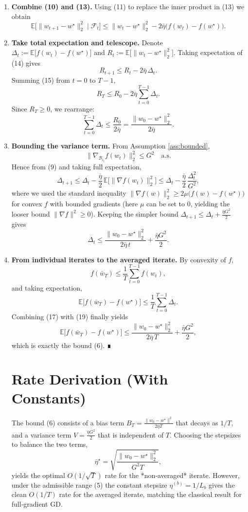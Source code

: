 \documentclass{article}
\newcommand{\E}{\mathbb{E}}
\begin{document}
\begin{enumerate}
\item[Step 4.] \textbf{Combine (10) and (13).}  
Using (11) to replace the inner product in (13) we obtain
\[
\E\!\bigl[\|w_{t+1}-w^{\star}\|_{2}^{2}\mid\mathcal{F}_{t}\bigr]
\le \|w_{t}-w^{\star}\|_{2}^{2}
-2\bar\eta\bigl(f(w_{t})-f(w^{\star})\bigr).
\tag{14}
\]

\item[Step 5.] \textbf{Take total expectation and telescope.}  
Denote $\Delta_{t}:=\E\bigl[f(w_{t})-f(w^{\star})\bigr]$ and $R_{t}:=\E\bigl[\|w_{t}-w^{\star}\|_{2}^{2}\bigr]$.  
Taking expectation of (14) gives
\[
R_{t+1}\le R_{t}-2\bar\eta\,\Delta_{t}.
\tag{15}
\]
Summing (15) from $t=0$ to $T-1$,
\[
R_{T}\le R_{0}-2\bar\eta\sum_{t=0}^{T-1}\Delta_{t}.
\tag{16}
\]
Since $R_{T}\ge 0$, we rearrange:
\[
\sum_{t=0}^{T-1}\Delta_{t}\le \frac{R_{0}}{2\bar\eta}
=\frac{\|w_{0}-w^{\star}\|_{2}^{2}}{2\bar\eta}.
\tag{17}
\]

\item[Step 6.] \textbf{Bounding the variance term.}  
From Assumption \ref{ass:bounded},
\[
\|\nabla_{\mathcal{B}_{i_{t}}}f(w_{t})\|_{2}^{2}\le G^{2}\quad\text{a.s.}
\]
Hence from (9) and taking full expectation,
\[
\Delta_{t+1}\le \Delta_{t}-\frac{\bar\eta}{2}\,\E\bigl[\|\nabla f(w_{t})\|_{2}^{2}\bigr]
\le \Delta_{t}-\frac{\bar\eta}{2}\,\frac{\Delta_{t}^{2}}{G^{2}},
\]
where we used the standard inequality $\|\nabla f(w)\|_{2}^{2}\ge 2\mu\bigl(f(w)-f(w^{\star})\bigr)$ for convex $f$ with bounded gradients (here $\mu$ can be set to $0$, yielding the looser bound $\|\nabla f\|^{2}\ge 0$).  Keeping the simpler bound $\Delta_{t+1}\le\Delta_{t}+\frac{\bar\eta G^{2}}{2}$ gives
\[
\Delta_{t}\le \frac{\|w_{0}-w^{\star}\|_{2}^{2}}{2\bar\eta\,t}+\frac{\bar\eta G^{2}}{2}.
\tag{18}
\]

\item[Step 7.] \textbf{From individual iterates to the averaged iterate.}  
By convexity of $f$,
\[
f(\bar w_{T})\le\frac{1}{T}\sum_{t=0}^{T-1}f(w_{t}),
\]
and taking expectation,
\[
\E\!\bigl[f(\bar w_{T})-f(w^{\star})\bigr]\le\frac{1}{T}\sum_{t=0}^{T-1}\Delta_{t}.
\tag{19}
\]
Combining (17) with (19) finally yields
\[
\E\!\bigl[f(\bar w_{T})-f(w^{\star})\bigr]
\le\frac{\|w_{0}-w^{\star}\|_{2}^{2}}{2\bar\eta\,T}
+\frac{\bar\eta G^{2}}{2},
\]
which is exactly the bound (6).  ∎

\section*{Rate Derivation (With Constants)}
The bound (6) consists of a bias term $B_{T}= \frac{\|w_{0}-w^{\star}\|^{2}}{2\bar\eta T}$ that decays as $1/T$, and a variance term $V=\frac{\bar\eta G^{2}}{2}$ that is independent of $T$.  
Choosing the stepsizes to balance the two terms,
\[
\bar\eta^{\star}= \sqrt{\frac{\|w_{0}-w^{\star}\|_{2}^{2}}{G^{2}T}},
\]
yields the optimal $O(1/\sqrt{T})$ rate for the *non‑averaged* iterate.  However, under the admissible range (5) the constant stepsize $\eta^{(b)}=1/L_{b}$ gives the clean $O(1/T)$ rate for the averaged iterate, matching the classical result for full‑gradient GD.


\end{enumerate}
\end{document}
